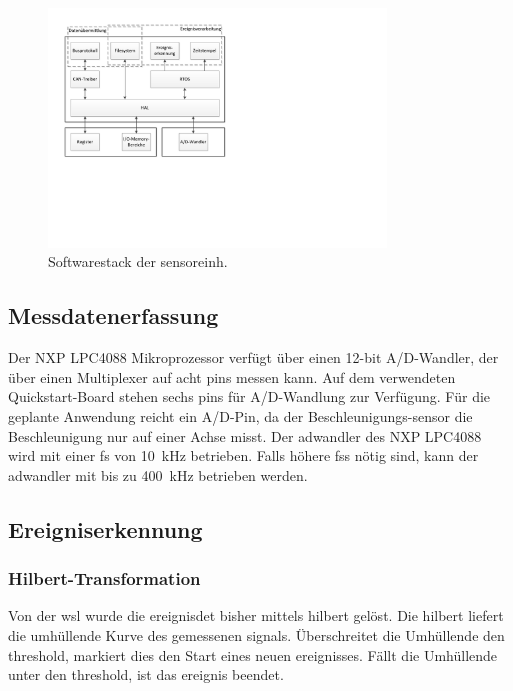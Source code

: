 \begin{figure}[H]
	\centering
		\includegraphics[width=0.8\textwidth]{images/visio/Softwarestack_Sensor.pdf}
	\caption{Softwarestack der \gls{sensoreinh}.}
	\label{fig.sw_sensor}
\end{figure}



\subsection{Messdatenerfassung}\label{subsec.sw_messen}
Der NXP LPC4088 Mikroprozessor verfügt über einen 12-bit A/D-Wandler, der über einen Multiplexer auf acht \glspl{pin} messen kann. Auf dem verwendeten Quickstart-Board stehen sechs \glspl{pin} für A/D-Wandlung zur Verfügung. Für die geplante Anwendung reicht ein A/D-Pin, da der Beschleunigungs-\gls{sensor} die Beschleunigung nur auf einer Achse misst. Der \gls{adwandler} des NXP LPC4088 wird mit einer \gls{fs} von 10~kHz betrieben. Falls höhere \glspl{fs} nötig sind, kann der \gls{adwandler} mit bis zu 400~kHz betrieben werden.



\subsection{Ereigniserkennung}\label{subsec.sw_ereignis}
\subsubsection{Hilbert-Transformation}
Von der \gls{wsl} wurde die \gls{ereignisdet} bisher mittels \gls{hilbert} gelöst. Die \gls{hilbert} liefert die umhüllende Kurve des gemessenen \gls{signal}s. Überschreitet die Umhüllende den \gls{threshold}, markiert dies den Start eines neuen \gls{ereignis}ses. Fällt die Umhüllende unter den \gls{threshold}, ist das \gls{ereignis} beendet.

